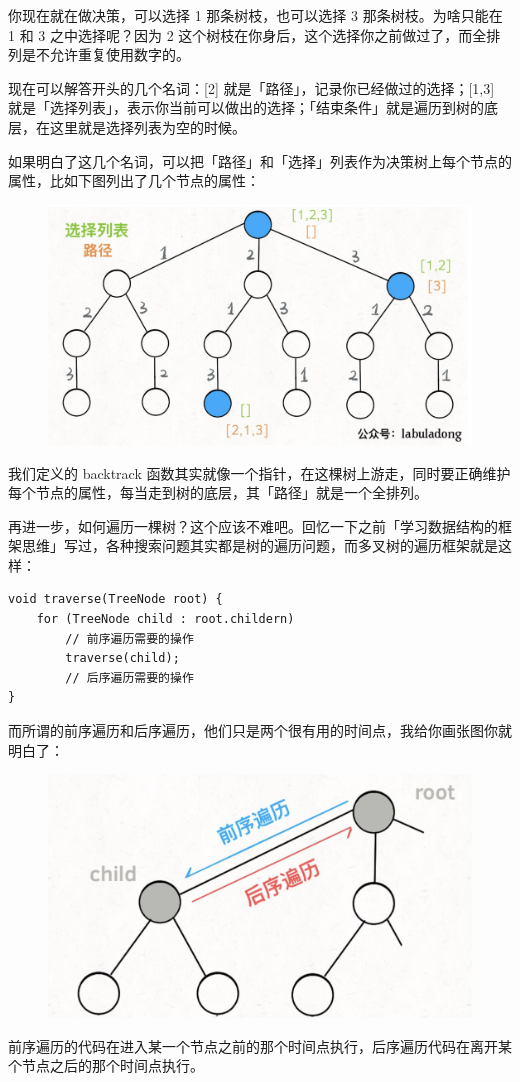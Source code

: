 \documentclass[12pt]{article}
\begin{document}
你现在就在做决策，可以选择 1 那条树枝，也可以选择 3 那条树枝。为啥只能在 1 和 3 之中选择呢？因为 2 这个树枝在你身后，这个选择你之前做过了，而全排列是不允许重复使用数字的。

现在可以解答开头的几个名词：[2] 就是「路径」，记录你已经做过的选择；[1,3] 就是「选择列表」，表示你当前可以做出的选择；「结束条件」就是遍历到树的底层，在这里就是选择列表为空的时候。

如果明白了这几个名词，可以把「路径」和「选择」列表作为决策树上每个节点的属性，比如下图列出了几个节点的属性：
\begin{figure}[H]
    \centering
    \includegraphics[width=.5\textwidth]{fig/Backtrack_3.png}
\end{figure}

我们定义的 backtrack 函数其实就像一个指针，在这棵树上游走，同时要正确维护每个节点的属性，每当走到树的底层，其「路径」就是一个全排列。

再进一步，如何遍历一棵树？这个应该不难吧。回忆一下之前「学习数据结构的框架思维」写过，各种搜索问题其实都是树的遍历问题，而多叉树的遍历框架就是这样：
\begin{lstlisting}
void traverse(TreeNode root) {
    for (TreeNode child : root.childern)
        // 前序遍历需要的操作
        traverse(child);
        // 后序遍历需要的操作
}
\end{lstlisting}

而所谓的前序遍历和后序遍历，他们只是两个很有用的时间点，我给你画张图你就明白了：
\begin{figure}[H]
    \centering
    \includegraphics[width=.5\textwidth]{fig/Backtrack_4.png}
\end{figure}

前序遍历的代码在进入某一个节点之前的那个时间点执行，后序遍历代码在离开某个节点之后的那个时间点执行。
\end{document}

